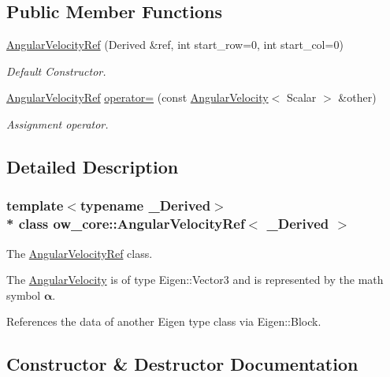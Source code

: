 \subsection*{Public Member Functions}
\begin{DoxyCompactItemize}
\item 
\hyperlink{classow__core_1_1AngularVelocityRef_a91920395f27a180d45f72c9783c891b5}{Angular\+Velocity\+Ref} (Derived \&ref, int start\+\_\+row=0, int start\+\_\+col=0)
\begin{DoxyCompactList}\small\item\em Default Constructor. \end{DoxyCompactList}\item 
\hyperlink{classow__core_1_1AngularVelocityRef}{Angular\+Velocity\+Ref} \hyperlink{classow__core_1_1AngularVelocityRef_a261e543406695f274d50c2b139dbf645}{operator=} (const \hyperlink{classow__core_1_1AngularVelocity}{Angular\+Velocity}$<$ Scalar $>$ \&other)\hypertarget{classow__core_1_1AngularVelocityRef_a261e543406695f274d50c2b139dbf645}{}\label{classow__core_1_1AngularVelocityRef_a261e543406695f274d50c2b139dbf645}

\begin{DoxyCompactList}\small\item\em Assignment operator. \end{DoxyCompactList}\end{DoxyCompactItemize}


\subsection{Detailed Description}
\subsubsection*{template$<$typename \+\_\+\+Derived$>$\\*
class ow\+\_\+core\+::\+Angular\+Velocity\+Ref$<$ \+\_\+\+Derived $>$}

The \hyperlink{classow__core_1_1AngularVelocityRef}{Angular\+Velocity\+Ref} class. 

The \hyperlink{classow__core_1_1AngularVelocity}{Angular\+Velocity} is of type Eigen\+::\+Vector3 and is represented by the math symbol $\mathbf{\alpha}$.

References the data of another Eigen type class via Eigen\+::\+Block. 

\subsection{Constructor \& Destructor Documentation}
